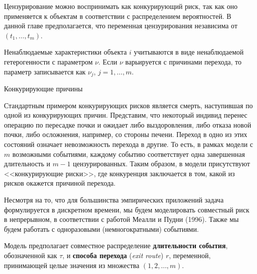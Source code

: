 Цензурирование можно воспринимать как конкурирующий риск, так как оно применяется к объектам в соответствии с распределением вероятностей. В данной главе предполагается, что переменная цензурирования независима от $(t_1, \ldots , t_m)$.

Ненаблюдаемые характеристики объекта $i$ учитываются в виде ненаблюдаемой гетерогенности с параметром $\nu$. Если $\nu$ варьируется с причинами перехода, то параметр записывается как $\nu_j$, $j = 1, \ldots , m$.

        \begin{center}Конкурирующие причины\end{center}
        \noindent
Стандартным примером конкурирующих рисков является смерть, наступившая по одной из конкурирующих причин. Представим, что некоторый индивид перенес операцию по пересадке почки и ожидает либо выздоровления, либо отказа новой почки, либо осложнения, например, со стороны печени. Переход в одно из этих состояний означает невозможность перехода в другие. То есть, в рамках модели с $m$ возможными событиями, каждому событию соответствует одна завершенная длительность и $m - 1$ цензурированных. Таким образом, в модели присутствуют <<конкурирующие риски>>, где конкуренция заключается в том, какой из рисков окажется причиной перехода.

Несмотря на то, что для большинства эмпирических приложений задача формулируется в дискретном времени, мы будем моделировать совместный риск в непрерывном, в соответствии с работой Меалли и Пудни (1996). Также мы будем работать с одноразовыми (немногократными) событиями.

Модель предполагает совместное распределение \textbf{длительности события}, обозначенной как $\tau$, и \textbf{способа перехода} (\textit{exit route}) $r$, переменной, принимающей целые значения из множества $(1, 2, \ldots , m)$.

